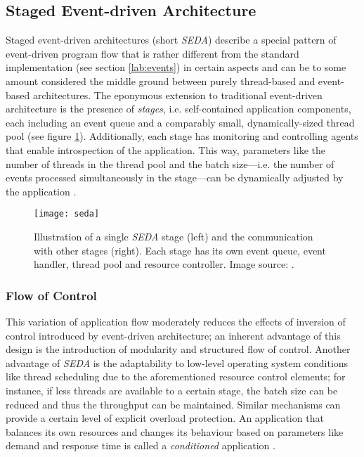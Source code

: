 \subsection{Staged Event-driven Architecture}
\label{sec:seda}
Staged event-driven architectures (short \textit{SEDA}) describe a special pattern of event-driven program flow that is rather different from the standard implementation (see section \ref{lab:events}) in certain aspects and can be to some amount considered the middle ground between purely thread-based and event-based architectures. The eponymous extension to traditional event-driven architecture is the presence of \textit{stages}, i.e. self-contained application components, each including an event queue and a comparably small, dynamically-sized thread pool (see figure \ref{fig:seda}). Additionally, each stage has monitoring and controlling agents that enable introspection of the application. This way, parameters like the number of threads in the thread pool and the batch size---i.e. the number of events processed simultaneously in the stage---can be dynamically adjusted by the application \cite{Welsh2001}.

\begin{figure}
\centering\small
\setlength{\tabcolsep}{0mm}
  \texttt{[image: seda]}
\caption{
Illustration of a single \textit{SEDA} stage (left) and the communication with other stages (right). Each stage has its own event queue, event handler, thread pool and resource controller. Image source: \cite{Welsh2001}.
}
\label{fig:seda}
\end{figure}

\subsubsection*{Flow of Control}
This variation of application flow moderately reduces the effects of inversion of control introduced by event-driven architecture; an inherent advantage of this design is the introduction of modularity and structured flow of control. Another advantage of \textit{SEDA} is the adaptability to low-level operating system conditions like thread scheduling due to the aforementioned resource control elements; for instance, if less threads are available to a certain stage, the batch size can be reduced and thus the throughput can be maintained. Similar mechanisms can provide a certain level of explicit overload protection. An application that balances its own resources and changes its behaviour based on parameters like demand and response time is called a \textit{conditioned} application \cite{Welsh2001}. 

